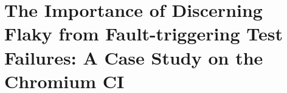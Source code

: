 \chapter{The Importance of Discerning Flaky from Fault-triggering Test Failures: A Case Study on the Chromium CI}
\label{chap:chromium}

\chapterPage{
}









